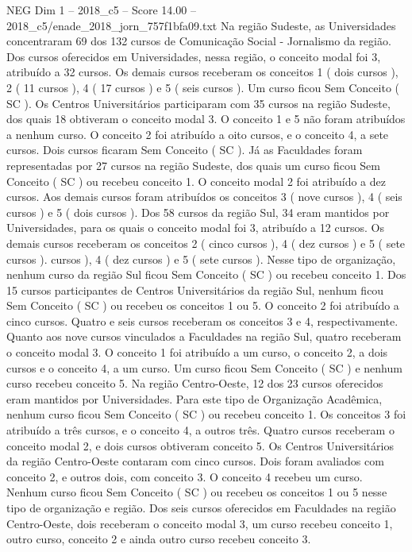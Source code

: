 \begin{textsample}{NEG Dim 1 – 2018\_c5 – Score 14.00 – 2018\_c5/enade\_2018\_jorn\_757f1bfa09.txt}
Na região Sudeste, as Universidades concentraram 69 dos 132 cursos de Comunicação Social - Jornalismo da região.
Dos cursos oferecidos em Universidades, nessa região, o conceito modal foi 3, atribuído a 32 cursos.
Os demais cursos receberam os conceitos 1 ( dois cursos ), 2 ( 11 cursos ), 4 ( 17 cursos ) e 5 ( seis cursos ).
Um curso ficou Sem Conceito ( SC ).
Os Centros Universitários participaram com 35 cursos na região Sudeste, dos quais 18 obtiveram o conceito modal 3.
O conceito 1 e 5 não foram atribuídos a nenhum curso.
O conceito 2 foi atribuído a oito cursos, e o conceito 4, a sete cursos.
Dois cursos ficaram Sem Conceito ( SC ).
Já as Faculdades foram representadas por 27 cursos na região Sudeste, dos quais um curso ficou Sem Conceito ( SC ) ou recebeu conceito 1.
O conceito modal 2 foi atribuído a dez cursos.
Aos demais cursos foram atribuídos os conceitos 3 ( nove cursos ), 4 ( seis cursos ) e 5 ( dois cursos ).
Dos 58 cursos da região Sul, 34 eram mantidos por Universidades, para os quais o conceito modal foi 3, atribuído a 12 cursos.
Os demais cursos receberam os conceitos 2 ( cinco cursos ), 4 ( dez cursos ) e 5 ( sete cursos ). cursos ), 4 ( dez cursos ) e 5 ( sete cursos ).
Nesse tipo de organização, nenhum curso da região Sul ficou Sem Conceito ( SC ) ou recebeu conceito 1.
Dos 15 cursos participantes de Centros Universitários da região Sul, nenhum ficou Sem Conceito ( SC ) ou recebeu os conceitos 1 ou 5.
O conceito 2 foi atribuído a cinco cursos.
Quatro e seis cursos receberam os conceitos 3 e 4, respectivamente.
Quanto aos nove cursos vinculados a Faculdades na região Sul, quatro receberam o conceito modal 3.
O conceito 1 foi atribuído a um curso, o conceito 2, a dois cursos e o conceito 4, a um curso.
Um curso ficou Sem Conceito ( SC ) e nenhum curso recebeu conceito 5.
Na região Centro-Oeste, 12 dos 23 cursos oferecidos eram mantidos por Universidades.
Para este tipo de Organização Acadêmica, nenhum curso ficou Sem Conceito ( SC ) ou recebeu conceito 1.
Os conceitos 3 foi atribuído a três cursos, e o conceito 4, a outros três.
Quatro cursos receberam o conceito modal 2, e dois cursos obtiveram conceito 5.
Os Centros Universitários da região Centro-Oeste contaram com cinco cursos.
Dois foram avaliados com conceito 2, e outros dois, com conceito 3.
O conceito 4 recebeu um curso.
Nenhum curso ficou Sem Conceito ( SC ) ou recebeu os conceitos 1 ou 5 nesse tipo de organização e região.
Dos seis cursos oferecidos em Faculdades na região Centro-Oeste, dois receberam o conceito modal 3, um curso recebeu conceito 1, outro curso, conceito 2 e ainda outro curso recebeu conceito 3.

\end{textsample}
